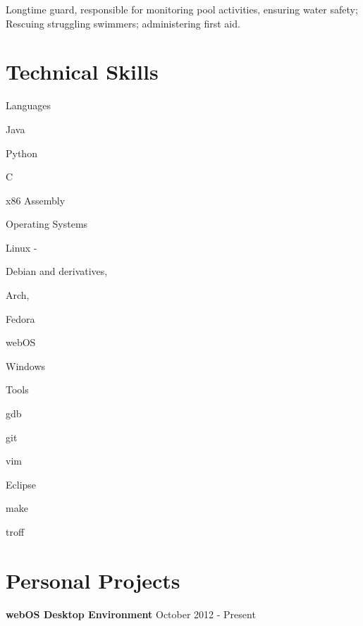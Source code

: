 \documentclass[letter,margin,line]{resume}
\begin{document}
\begin{resume}
\begin{asparadesc}
        \small
        Longtime guard, responsible for monitoring pool activities, ensuring water safety; Rescuing struggling swimmers; administering first aid.
		\normalsize
		\\
	\end{asparadesc}

\section{\mysidestyle Technical Skills}
	\begin{compactdesc}
		\item[Languages] \begin{inparaenum} { \small
			\item Java
			\item Python
			\item C
			\item x86 Assembly
		} \end{inparaenum}
		\item[Operating Systems] \begin{inparaenum} { \small
			\item Linux -
			\begin{inparablank}
				\item Debian and derivatives,
				\item Arch,
				\item Fedora
				\item webOS
			\end{inparablank}
			\item Windows
		} \end{inparaenum}
		\item[Tools] \begin{inparaenum} { \small
			\item gdb
			\item git
			\item vim
			\item Eclipse
			\item make
			\item troff
		} \end{inparaenum}
	\end{compactdesc}
\section{\mysidestyle Personal Projects}
	\begin{asparablank}
		\item {\bf webOS Desktop Environment} \hfill October 2012 - Present
		

\end{asparablank}
\end{resume}
\end{document}
